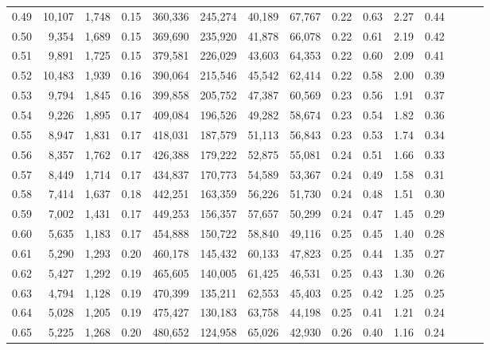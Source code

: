 \begin{tabular}{rrrrrrrrrrrrrrr}
0.49 &  10,107 &  1,748 &  0.15 &  360,336 &  245,274 &   40,189 &   67,767 &  0.22 &  0.63 &  2.27 &      0.44 \\
0.50 &   9,354 &  1,689 &  0.15 &  369,690 &  235,920 &   41,878 &   66,078 &  0.22 &  0.61 &  2.19 &      0.42 \\
0.51 &   9,891 &  1,725 &  0.15 &  379,581 &  226,029 &   43,603 &   64,353 &  0.22 &  0.60 &  2.09 &      0.41 \\
0.52 &  10,483 &  1,939 &  0.16 &  390,064 &  215,546 &   45,542 &   62,414 &  0.22 &  0.58 &  2.00 &      0.39 \\
0.53 &   9,794 &  1,845 &  0.16 &  399,858 &  205,752 &   47,387 &   60,569 &  0.23 &  0.56 &  1.91 &      0.37 \\
0.54 &   9,226 &  1,895 &  0.17 &  409,084 &  196,526 &   49,282 &   58,674 &  0.23 &  0.54 &  1.82 &      0.36 \\
0.55 &   8,947 &  1,831 &  0.17 &  418,031 &  187,579 &   51,113 &   56,843 &  0.23 &  0.53 &  1.74 &      0.34 \\
0.56 &   8,357 &  1,762 &  0.17 &  426,388 &  179,222 &   52,875 &   55,081 &  0.24 &  0.51 &  1.66 &      0.33 \\
0.57 &   8,449 &  1,714 &  0.17 &  434,837 &  170,773 &   54,589 &   53,367 &  0.24 &  0.49 &  1.58 &      0.31 \\
0.58 &   7,414 &  1,637 &  0.18 &  442,251 &  163,359 &   56,226 &   51,730 &  0.24 &  0.48 &  1.51 &      0.30 \\
0.59 &   7,002 &  1,431 &  0.17 &  449,253 &  156,357 &   57,657 &   50,299 &  0.24 &  0.47 &  1.45 &      0.29 \\
0.60 &   5,635 &  1,183 &  0.17 &  454,888 &  150,722 &   58,840 &   49,116 &  0.25 &  0.45 &  1.40 &      0.28 \\
0.61 &   5,290 &  1,293 &  0.20 &  460,178 &  145,432 &   60,133 &   47,823 &  0.25 &  0.44 &  1.35 &      0.27 \\
0.62 &   5,427 &  1,292 &  0.19 &  465,605 &  140,005 &   61,425 &   46,531 &  0.25 &  0.43 &  1.30 &      0.26 \\
0.63 &   4,794 &  1,128 &  0.19 &  470,399 &  135,211 &   62,553 &   45,403 &  0.25 &  0.42 &  1.25 &      0.25 \\
0.64 &   5,028 &  1,205 &  0.19 &  475,427 &  130,183 &   63,758 &   44,198 &  0.25 &  0.41 &  1.21 &      0.24 \\
0.65 &   5,225 &  1,268 &  0.20 &  480,652 &  124,958 &   65,026 &   42,930 &  0.26 &  0.40 &  1.16 &      0.24 \\

\end{tabular}
